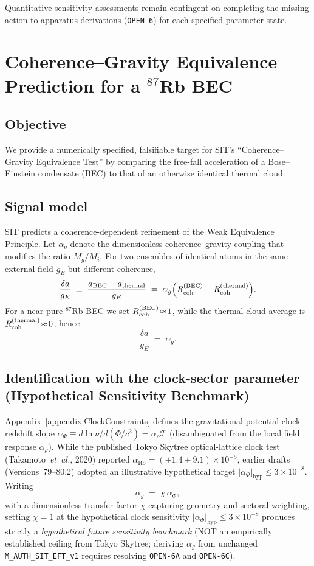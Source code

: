 Quantitative sensitivity assessments remain contingent on completing the missing action-to-apparatus derivations (\texttt{OPEN-6}) for each specified parameter state.

\section{Coherence--Gravity Equivalence Prediction for a \texorpdfstring{$^{87}$}{87}Rb BEC}
\label{appendix:E-BEC}
\label{app:BEC-benchmark}

\subsection{Objective}
We provide a numerically specified, falsifiable target for SIT's ``Coherence--Gravity Equivalence Test'' by comparing the free-fall acceleration of a Bose--Einstein condensate (BEC) to that of an otherwise identical thermal cloud.

\subsection{Signal model}
SIT predicts a coherence-dependent refinement of the Weak Equivalence Principle. Let $\alpha_g$ denote the dimensionless coherence--gravity coupling that modifies the ratio $M_g/M_i$. For two ensembles of identical atoms in the same external field $g_E$ but different coherence,
\[
\frac{\delta a}{g_E} \;\equiv\; \frac{a_{\rm BEC}-a_{\rm thermal}}{g_E}
\;=\; \alpha_g\Big(R_{\rm coh}^{\rm (BEC)} - R_{\rm coh}^{\rm (thermal)}\Big).
\]
For a near-pure $^{87}$Rb BEC we set $R_{\rm coh}^{\rm (BEC)}\!\approx\!1$, while the thermal cloud average is $R_{\rm coh}^{\rm (thermal)}\!\approx\!0$, hence
\[
\frac{\delta a}{g_E} \;=\; \alpha_g.
\]

\subsection{Identification with the clock-sector parameter (Hypothetical Sensitivity Benchmark)}
Appendix~\ref{appendix:ClockConstraints} defines the gravitational-potential clock-redshift slope
\(\alpha_\Phi \equiv d\ln\nu/d(\Phi/c^{2}) = \alpha_\rho\mathcal{T}\) (disambiguated from the local field response \(\alpha_\rho\)). While the published Tokyo Skytree optical-lattice clock test (Takamoto~\emph{et~al.}, 2020) reported \(\alpha_{\mathrm{RS}} = (+1.4 \pm 9.1)\times 10^{-5}\), earlier drafts (Versions~79--80.2) adopted an illustrative hypothetical target \(|\alpha_\Phi|_{\mathrm{hyp}} \le 3\times 10^{-8}\). Writing
\[
\alpha_g \;=\; \chi\,\alpha_\Phi,
\]
with a dimensionless transfer factor $\chi$ capturing geometry and sectoral weighting, setting $\chi = 1$ at the hypothetical clock sensitivity $|\alpha_\Phi|_{\mathrm{hyp}} \le 3\times 10^{-8}$ produces strictly a \emph{hypothetical future sensitivity benchmark} (NOT an empirically established ceiling from Tokyo Skytree; deriving $\alpha_g$ from unchanged \texttt{M\_AUTH\_SIT\_EFT\_v1} requires resolving \texttt{OPEN-6A} and \texttt{OPEN-6C}).

